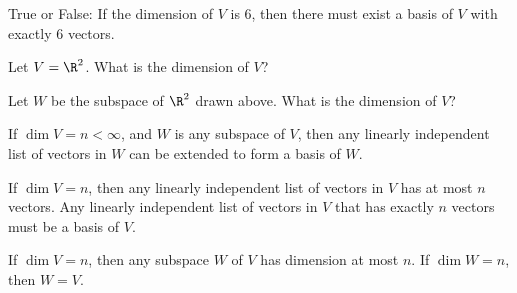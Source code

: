 
\edXsolution{
}

\endedxproblem




True or False: If the dimension of $V$ is 6, then there must exist a basis of $V$ with exactly 6 vectors.


\edXsolution{
}

\endedxproblem


Let $V = \R^2$.  What is the dimension of $V$?  


\edXsolution{
}

\endedxproblem




\begin{center}

\end{center}

Let $W$ be the subspace of $\R^2$ drawn above.  What is the dimension of $V$?  



\edXsolution{
}

\endedxproblem


\endedxvertical










{}  If $\dim V = n < \infty$, and $W$ is any subspace of $V$, then any
linearly independent list of vectors in $W$ can be extended to form a basis of $W$.  

{} If $\dim V = n$, then any linearly independent list of vectors in $V$ has
at most $n$ vectors.  Any linearly independent list of vectors in $V$ that has exactly $n$ vectors must
be a basis of $V$.  


{} If $\dim V = n$, then any subspace $W$ of $V$ has dimension at most $n$.  
If $\dim W = n$, then $W = V$.  


